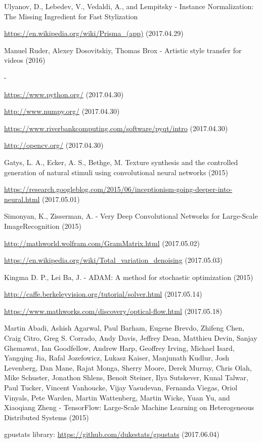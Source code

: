 \documentclass[12pt, a4paper, oneside]{book}
\theoremstyle{tetel}
\begin{document}
\begin{thebibliography}{1}
Ulyanov, D., Lebedev, V., Vedaldi, A., and Lempitsky - Instance Normalization: The Missing Ingredient for Fast Stylization

\url{https://en.wikipedia.org/wiki/Prisma_(app)} (2017.04.29)

Manuel Ruder, Alexey Dosovitskiy, Thomas Brox - Artistic style transfer for videos (2016)

-

\url{https://www.python.org/} (2017.04.30)

\url{http://www.numpy.org/} (2017.04.30)

\url{https://www.riverbankcomputing.com/software/pyqt/intro} (2017.04.30)

\url{http://opencv.org/} (2017.04.30)

Gatys, L. A., Ecker, A. S., Bethge, M. Texture synthesis and the controlled generation of natural stimuli using convolutional neural networks (2015)

\url{https://research.googleblog.com/2015/06/inceptionism-going-deeper-into-neural.html} (2017.05.01)

Simonyan, K., Zisserman, A. - Very Deep Convolutional Networks for Large-Scale ImageRecognition (2015)

\url{http://mathworld.wolfram.com/GramMatrix.html} (2017.05.02)

\url{https://en.wikipedia.org/wiki/Total_variation_denoising} (2017.05.03)

Kingma D. P., Lei Ba, J. - ADAM: A method for stochastic optimization (2015)

\url{http://caffe.berkeleyvision.org/tutorial/solver.html} (2017.05.14)

\url{https://www.mathworks.com/discovery/optical-flow.html} (2017.05.18)

Martin Abadi, Ashish Agarwal, Paul Barham, Eugene Brevdo, Zhifeng Chen, Craig Citro, Greg S. Corrado, Andy Davis, Jeffrey Dean, Matthieu Devin, Sanjay Ghemawat, Ian Goodfellow, Andrew Harp, Geoffrey Irving, Michael Isard, Yangqing Jia, Rafal Jozefowicz, Lukasz Kaiser, Manjunath Kudlur, Josh Levenberg, Dan Mane, Rajat Monga, Sherry Moore, Derek Murray, Chris Olah, Mike Schuster, Jonathon Shlens, Benoit Steiner, Ilya Sutskever, Kunal Talwar, Paul Tucker, Vincent Vanhoucke, Vijay Vasudevan, Fernanda Viegas, Oriol Vinyals, Pete Warden, Martin Wattenberg, Martin Wicke, Yuan Yu, and Xiaoqiang Zheng - TensorFlow: Large-Scale Machine Learning on Heterogeneous Distributed Systems (2015)

gpustats library: \url{https://github.com/dukestats/gpustats} (2017.06.04)


\end{thebibliography}
\end{document}

